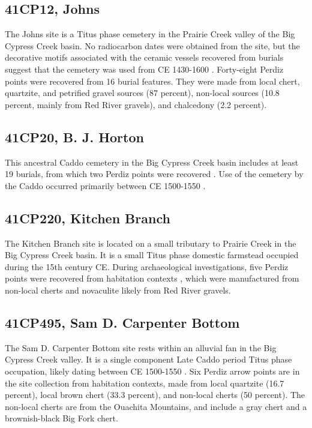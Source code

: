 \documentclass[review]{elsarticle}
\begin{document}
\subsection*{41CP12, Johns}

The Johns site is a Titus phase cemetery in the Prairie Creek valley of the Big Cypress Creek basin. No radiocarbon dates were obtained from the site, but the decorative motifs associated with the ceramic vessels recovered from burials suggest that the cemetery was used from CE 1430-1600 \citep{RN2440}. Forty-eight Perdiz points were recovered from 16 burial features. They were made from local chert, quartzite, and petrified gravel sources (87 percent), non-local sources (10.8 percent, mainly from Red River gravels), and chalcedony (2.2 percent).

\subsection*{41CP20, B. J. Horton}

This ancestral Caddo cemetery in the Big Cypress Creek basin includes at least 19 burials, from which two Perdiz points were recovered \citep[9]{RN2439}. Use of the cemetery by the Caddo occurred primarily between CE 1500-1550 \citep[494]{RN8964}.

\subsection*{41CP220, Kitchen Branch}

The Kitchen Branch site is located on a small tributary to Prairie Creek in the Big Cypress Creek basin. It is a small Titus phase domestic farmstead occupied during the 15th century CE. During archaeological investigations, five Perdiz points were recovered from habitation contexts \citep{RN8964}, which were manufactured from non-local cherts and novaculite \citep[410]{RN8964} likely from Red River gravels.

\subsection*{41CP495, Sam D. Carpenter Bottom}

The Sam D. Carpenter Bottom site rests within an alluvial fan in the Big Cypress Creek valley. It is a single component Late Caddo period Titus phase occupation, likely dating between CE 1500-1550 \citep{RN2275}. Six Perdiz arrow points are in the site collection from habitation contexts, made from local quartzite (16.7 percent), local brown chert (33.3 percent), and non-local cherts (50 percent). The non-local cherts are from the Ouachita Mountains, and include a gray chert and a brownish-black Big Fork chert.
\end{document}
